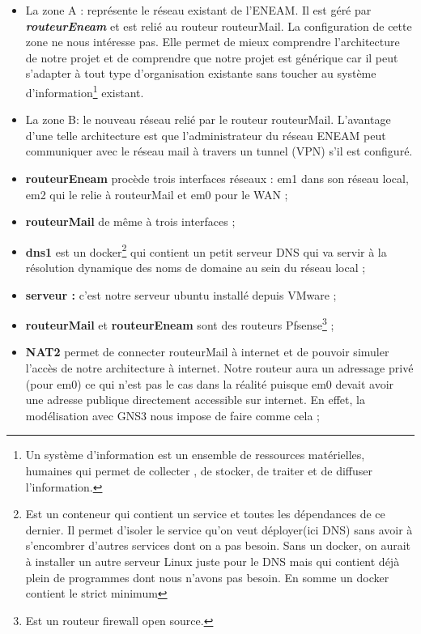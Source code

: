 \documentclass[a4paper,12pt,french]{report} %
\begin{document}
\begin{itemize}
\item La zone A : représente le réseau existant de l'ENEAM. Il est géré par \emph{\textbf{routeurEneam}} et est relié au routeur routeurMail. La configuration de cette zone ne nous intéresse pas. Elle permet de mieux comprendre l'architecture de notre projet et de comprendre que notre projet est générique car il peut s'adapter à tout type d'organisation existante sans toucher au système d'information\footnote{ Un système d'information est un ensemble de ressources matérielles, humaines qui permet de collecter , de stocker, de traiter et de diffuser l'information.} existant.
\item La zone B: le nouveau réseau relié par le routeur routeurMail.
L'avantage d'une telle architecture est que l'administrateur du réseau ENEAM peut communiquer avec le réseau mail à travers un tunnel (VPN) s'il est configuré.
\item \textbf{routeurEneam} procède trois interfaces réseaux : em1 dans son réseau local, em2 qui le relie à routeurMail et em0 pour le WAN ;
\item \textbf{routeurMail} de même à trois interfaces ;
\item \textbf{dns1} est un docker\footnote{Est un conteneur qui contient un service et toutes les dépendances de ce dernier. Il permet d'isoler le service qu'on veut déployer(ici DNS) sans avoir à s'encombrer d'autres services dont on a pas besoin. Sans un docker, on aurait à installer un autre serveur Linux juste pour le DNS mais qui contient déjà plein de programmes dont nous n'avons  pas besoin. En somme un docker contient le strict minimum} qui contient un petit serveur DNS qui va servir à la résolution dynamique des noms de domaine au sein du réseau local ;
\item \textbf{serveur :} c'est notre serveur ubuntu installé depuis VMware ;
\item \textbf{routeurMail} et \textbf{routeurEneam} sont des routeurs Pfsense\footnote{Est un routeur firewall open source.} ;
\item \textbf{NAT2} permet de connecter routeurMail à internet et de pouvoir simuler l'accès de notre architecture à internet. Notre routeur aura un adressage privé (pour em0) ce qui n'est pas le cas dans la réalité puisque em0 devait avoir une adresse publique directement accessible sur internet. En effet, la modélisation avec GNS3 nous impose de faire comme cela ;
\end{itemize}
\end{document}
